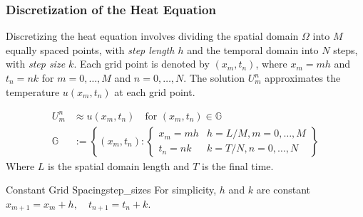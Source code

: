 \subsubsection{Discretization of the Heat Equation}
Discretizing the heat equation involves dividing the spatial domain \(\Omega\) into \(M\) equally spaced points, with \emph{step length \(h\)} and the temporal domain into \(N\) steps, with \emph{step size \(k\)}.
Each grid point is denoted by \((x_m, t_n)\), where \(x_m = m h\) and \(t_n = n k\) for \(m = 0, \ldots, M\) and \(n = 0, \ldots, N\). The solution \(U_m^n\) approximates the temperature \(u(x_m, t_n)\) at each grid point.

\begin{minipage}[l]{0.45\textwidth}
  \begin{align*}
    U_m^n      & \approx u(x_m, t_n) \quad \text{for } (x_m, t_n) \in \mathbb{G} \\[1em]
    \mathbb{G} & := \left\{(x_m, t_n):
    \begin{cases}
      x_m = m h & h = L/M, m = 0, \ldots, M \\
      t_n = n k & k = T/N, n = 0, \ldots, N
    \end{cases}\right\}
  \end{align*}\label{eq:grid_points}
  Where \(L\) is the spatial domain length and \(T\) is the final time.
  \begin{remark}{Constant Grid Spacing}{step_sizes}
    For simplicity, \(h\) and \(k\) are constant \( x_{m+1} = x_m + h,\quad t_{n+1} = t_n + k \).
  \end{remark}

\end{minipage}
\hspace{0.05\textwidth}
\begin{minipage}[r]{0.45\textwidth}
\end{minipage}

